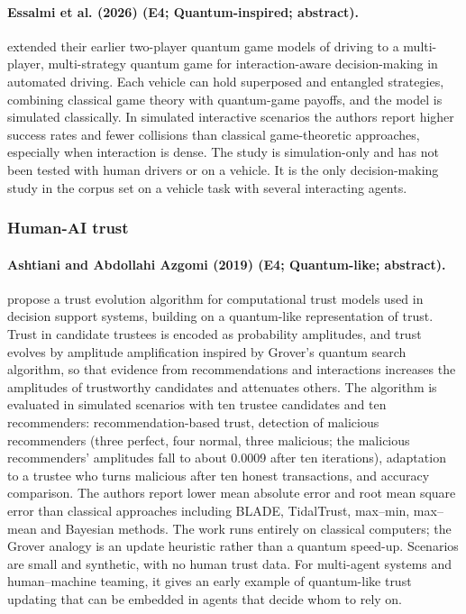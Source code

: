 \documentclass[10pt,a4paper]{article}
\begin{document}
\paragraph{Essalmi et al. (2026) (E4; Quantum-inspired; abstract).} \citet{Essalmi2026} extended their earlier two-player quantum game models of driving \citep{Essalmi2025} to a multi-player, multi-strategy quantum game for interaction-aware decision-making in automated driving. Each vehicle can hold superposed and entangled strategies, combining classical game theory with quantum-game payoffs, and the model is simulated classically. In simulated interactive scenarios the authors report higher success rates and fewer collisions than classical game-theoretic approaches, especially when interaction is dense. The study is simulation-only and has not been tested with human drivers or on a vehicle. It is the only decision-making study in the corpus set on a vehicle task with several interacting agents.

\subsubsection*{Human-AI trust}
\paragraph{Ashtiani and Abdollahi Azgomi (2019) (E4; Quantum-like; abstract).} \citet{Ashtiani2019} propose a trust evolution algorithm for computational trust models used in decision support systems, building on a quantum-like representation of trust. Trust in candidate trustees is encoded as probability amplitudes, and trust evolves by amplitude amplification inspired by Grover's quantum search algorithm, so that evidence from recommendations and interactions increases the amplitudes of trustworthy candidates and attenuates others. The algorithm is evaluated in simulated scenarios with ten trustee candidates and ten recommenders: recommendation-based trust, detection of malicious recommenders (three perfect, four normal, three malicious; the malicious recommenders' amplitudes fall to about 0.0009 after ten iterations), adaptation to a trustee who turns malicious after ten honest transactions, and accuracy comparison. The authors report lower mean absolute error and root mean square error than classical approaches including BLADE, TidalTrust, max--min, max--mean and Bayesian methods. The work runs entirely on classical computers; the Grover analogy is an update heuristic rather than a quantum speed-up. Scenarios are small and synthetic, with no human trust data. For multi-agent systems and human--machine teaming, it gives an early example of quantum-like trust updating that can be embedded in agents that decide whom to rely on.
\end{document}
